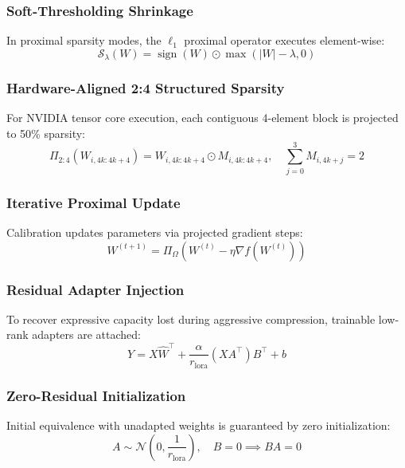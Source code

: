 \subsubsection{Soft-Thresholding Shrinkage}
In proximal sparsity modes, the $\ell_1$ proximal operator executes element-wise:
\begin{equation}
\mathcal{S}_\lambda(W) = \operatorname{sign}(W) \odot \max(|W| - \lambda, 0)
\end{equation}

\subsubsection{Hardware-Aligned 2:4 Structured Sparsity}
For NVIDIA tensor core execution, each contiguous 4-element block is projected to 50\% sparsity:
\begin{equation}
\Pi_{2:4}(W_{i, 4k:4k+4}) = W_{i, 4k:4k+4} \odot M_{i, 4k:4k+4}, \quad \sum_{j=0}^{3} M_{i, 4k+j} = 2
\end{equation}

\subsubsection{Iterative Proximal Update}
Calibration updates parameters via projected gradient steps:
\begin{equation}
W^{(t+1)} = \Pi_{\Omega}\left( W^{(t)} - \eta \nabla f(W^{(t)}) \right)
\end{equation}

\subsubsection{Residual Adapter Injection}
To recover expressive capacity lost during aggressive compression, trainable low-rank adapters are attached:
\begin{equation}
Y = X \hat{W}^\top + \frac{\alpha}{r_{\text{lora}}} (X A^\top) B^\top + b
\end{equation}

\subsubsection{Zero-Residual Initialization}
Initial equivalence with unadapted weights is guaranteed by zero initialization:
\begin{equation}
A \sim \mathcal{N}\left(0, \frac{1}{r_{\text{lora}}}\right), \quad B = 0 \implies B A = 0
\end{equation}

